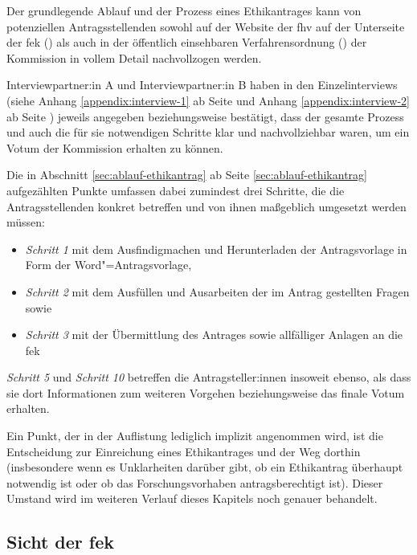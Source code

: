 \documentclass[a4paper,12pt,twoside]{scrreprt}
\begin{document}
Der grundlegende Ablauf und der Prozess eines Ethikantrages kann von potenziellen Antragsstellenden sowohl auf der Website der \ac{fhv} auf der Unterseite der \ac{fek} (\cite{fachhochschule_vorarlberg_gmbh_forschungsethik-kommission_2021}) als auch in der öffentlich einsehbaren Verfahrensordnung (\cite{forschungsethik-kommission_der_fachhochschule_vorarlberg_verfahrensordnung_2020}) der Kommission in vollem Detail nachvollzogen werden.

Interviewpartner:in A und Interviewpartner:in B haben in den Einzelinterviews (siehe Anhang \ref{appendix:interview-1} ab Seite \pageref{appendix:interview-1} und Anhang \ref{appendix:interview-2} ab Seite \pageref{appendix:interview-2}) jeweils angegeben beziehungsweise bestätigt, dass der gesamte Prozess und auch die für sie notwendigen Schritte klar und nachvollziehbar waren, um ein Votum der Kommission erhalten zu können.

\medskip

Die in Abschnitt \ref{sec:ablauf-ethikantrag} ab Seite \ref{sec:ablauf-ethikantrag} aufgezählten Punkte umfassen dabei zumindest drei Schritte, die die Antragsstellenden konkret betreffen und von ihnen maßgeblich umgesetzt werden müssen:
\begin{itemize}
    \item \textit{Schritt 1} mit dem Ausfindigmachen und Herunterladen der Antragsvorlage in Form der Word"=Antragsvorlage,
    \item \textit{Schritt 2} mit dem Ausfüllen und Ausarbeiten der im Antrag gestellten Fragen sowie
    \item \textit{Schritt 3} mit der Übermittlung des Antrages sowie allfälliger Anlagen an die \ac{fek}
\end{itemize}

\noindent\textit{Schritt 5} und \textit{Schritt 10} betreffen die Antragsteller:innen insoweit ebenso, als dass sie dort Informationen zum weiteren Vorgehen beziehungsweise das finale Votum erhalten.

Ein Punkt, der in der Auflistung lediglich implizit angenommen wird, ist die Entscheidung zur Einreichung eines Ethikantrages und der Weg dorthin (insbesondere wenn es Unklarheiten darüber gibt, ob ein Ethikantrag überhaupt notwendig ist oder ob das Forschungsvorhaben antragsberechtigt ist). Dieser Umstand wird im weiteren Verlauf dieses Kapitels noch genauer behandelt.

\subsection{Sicht der \acl{fek}}
\label{sub-sec:ablauf-sicht-fek}
\end{document}
